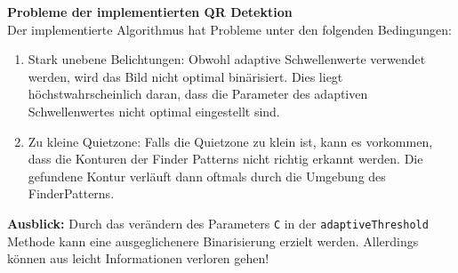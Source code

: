 \textbf{Probleme der implementierten QR Detektion} \\
Der implementierte Algorithmus hat Probleme unter den folgenden Bedingungen:
\begin{enumerate}
\item Stark unebene Belichtungen: Obwohl adaptive Schwellenwerte verwendet werden, wird das Bild nicht optimal binärisiert. Dies liegt höchstwahrscheinlich daran, dass die Parameter des adaptiven Schwellenwertes nicht optimal eingestellt sind. 

\item Zu kleine Quietzone: Falls die Quietzone zu klein ist, kann es vorkommen, dass die Konturen der Finder Patterns nicht richtig erkannt werden. Die gefundene Kontur verläuft dann oftmals durch die Umgebung des FinderPatterns.
\end{enumerate}





\textbf{Ausblick:} Durch das verändern des Parameters \texttt{C} in der \texttt{adaptiveThreshold} Methode kann eine ausgeglichenere Binarisierung erzielt werden. Allerdings können aus leicht Informationen verloren gehen!


